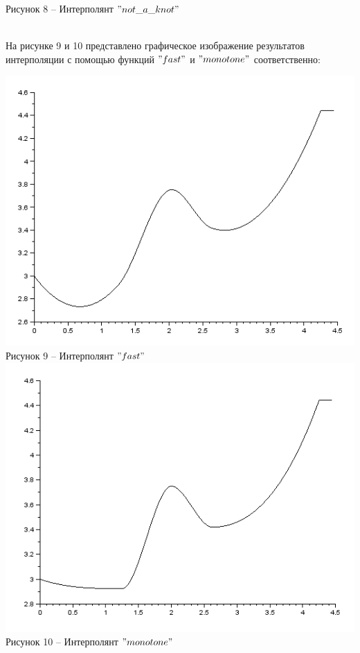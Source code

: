 \documentclass[russian, utf8, nocolumnxxxi, nocolumnxxxii, 14pt]{eskdtext}
\begin{document}
\begin{center}
Рисунок 8 -- Интерполянт $"not\_a\_knot"$\\
\end{center}\\
\indent На рисунке 9 и 10 представлено графическое изображение результатов интерполяции с помощью функций $"fast"$ и $"monotone"$ соответственно:\\
\begin{center}
\includegraphics[scale=0.65]{JPG/fst.png}\\
Рисунок 9 -- Интерполянт $"fast"$\\
\includegraphics[scale=0.65]{JPG/mnt.png}\\
Рисунок 10 -- Интерполянт $"monotone"$\\
\end{center}\\
\newpage
\end{document}
